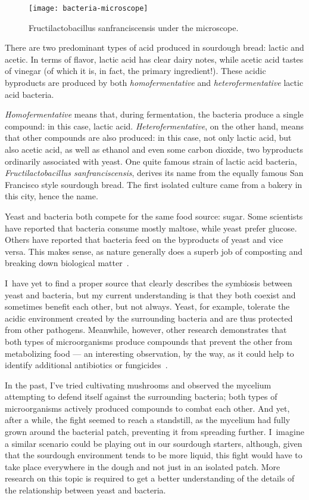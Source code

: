 \begin{figure}
  \texttt{[image: bacteria-microscope]}
  \caption[Bacteria under the microscope]{Fructilactobacillus
    sanfranciscensis under the microscope.}%
  \label{lactobacillus-franciscensis-microscope}
\end{figure}

There are two predominant types of acid produced in sourdough bread: lactic and
acetic. In terms of flavor, lactic acid has clear dairy notes, while acetic
acid tastes of vinegar (of which it is, in fact, the primary ingredient!). These
acidic byproducts are produced by both \emph{homofermentative} and
\emph{heterofermentative} lactic acid bacteria.

\emph{Homofermentative} means that, during fermentation, the bacteria produce
a single compound: in this case, lactic acid. \emph{Heterofermentative}, on
the other hand, means that other compounds are also produced: in this case,
not only lactic acid, but also acetic acid, as well as ethanol and even some
carbon dioxide, two byproducts ordinarily associated with yeast. One quite
famous strain of lactic acid bacteria, \emph{Fructilactobacillus sanfranciscensis},
derives its name from the equally famous San Francisco style sourdough bread.
The first isolated culture came from a bakery in this city, hence the name.

Yeast and bacteria both compete for the same food source: sugar. Some scientists
have reported that bacteria consume mostly maltose, while yeast prefer glucose.
Others have reported that bacteria feed on the byproducts of yeast and vice
versa. This makes sense, as nature generally does a superb job of composting
and breaking down biological matter~\cite{lactobacillus+sanfrancisco}.

I~have yet to find a proper source that clearly describes the symbiosis between
yeast and bacteria, but my current understanding is that they both coexist and
sometimes benefit each other, but not always. Yeast, for example, tolerate the
acidic environment created by the surrounding bacteria and are thus protected
from other pathogens. Meanwhile, however, other research demonstrates that both
types of microorganisms produce compounds that prevent the other from
metabolizing food --- an interesting observation, by the way, as it could help to
identify additional antibiotics or fungicides~\cite{mold+lactic+acid+bacteria}.

In the past, I've tried cultivating mushrooms and observed the mycelium
attempting to defend itself against the surrounding bacteria; both types of
microorganisms actively produced compounds to combat each other. And yet,
after a while, the fight seemed to reach a standstill, as the mycelium had
fully grown around the bacterial patch, preventing it from spreading further.
I~imagine a similar scenario could be playing out in our sourdough starters,
although, given that the sourdough environment tends to be more liquid, this
fight would have to take place everywhere in the dough and not just in an
isolated patch. More research on this topic is required to get a better understanding of
the details of the relationship between yeast and bacteria.

